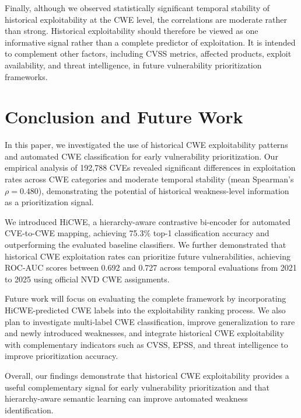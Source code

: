 \documentclass[conference,compsoc]{IEEEtran}
\begin{document}
Finally, although we observed statistically significant temporal stability of historical exploitability at the CWE level, the correlations are moderate rather than strong. Historical exploitability should therefore be viewed as one informative signal rather than a complete predictor of exploitation. It is intended to complement other factors, including CVSS metrics, affected products, exploit availability, and threat intelligence, in future vulnerability prioritization frameworks.


\section{Conclusion and Future Work}
\label{sec:conclusion}

In this paper, we investigated the use of historical
CWE exploitability patterns and automated CWE classification
for early vulnerability prioritization. Our empirical
analysis of 192,788 CVEs revealed significant differences
in exploitation rates across CWE categories and moderate
temporal stability (mean Spearman's $\rho=0.480$),
demonstrating the potential of historical weakness-level
information as a prioritization signal.

We introduced HiCWE, a hierarchy-aware contrastive
bi-encoder for automated CVE-to-CWE mapping, achieving
75.3\% top-1 classification accuracy and outperforming
the evaluated baseline classifiers. We further demonstrated
that historical CWE exploitation rates can prioritize
future vulnerabilities, achieving ROC-AUC scores between
0.692 and 0.727 across temporal evaluations from
2021 to 2025 using official NVD CWE assignments.

Future work will focus on evaluating the complete
framework by incorporating HiCWE-predicted CWE labels
into the exploitability ranking process. We also plan
to investigate multi-label CWE classification, improve
generalization to rare and newly introduced weaknesses,
and integrate historical CWE exploitability with
complementary indicators such as CVSS, EPSS, and
threat intelligence to improve prioritization accuracy.

Overall, our findings demonstrate that historical
CWE exploitability provides a useful complementary
signal for early vulnerability prioritization and
that hierarchy-aware semantic learning can improve
automated weakness identification.



\clearpage


\end{document}
